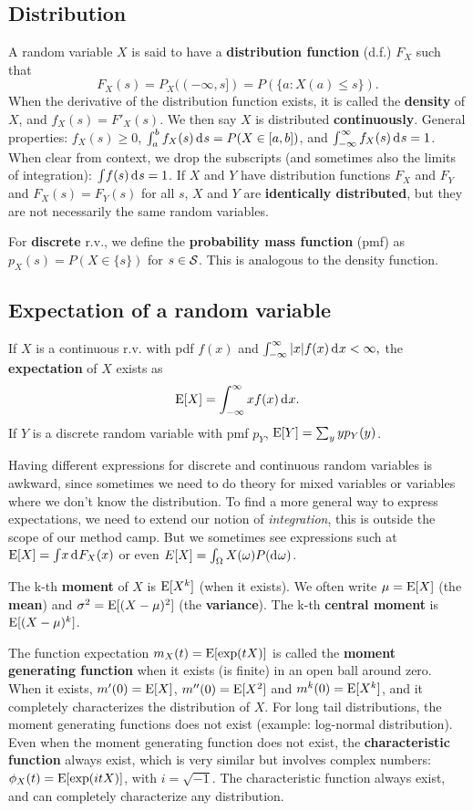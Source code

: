 \documentclass[twoside]{article}
\begin{document}
\subsection{Distribution}
A random variable $X$ is said to have a \textbf{distribution function} (d.f.) $F_X$
such that \[ F_X(s) = P_X((-\infty, s])=P(\{a: X(a)\leq s\}).\] When the derivative of the
distribution function exists, it is called the \textbf{density} of $X$, and
$f_X(s)=F'_X(s)$. We then say $X$ is distributed \textbf{continuously}. General
properties: $f_X(s)\geq0$, $\int_a^b f_X(s)\rd s = P(X\in[a,b])$, and
$\int_{-\infty}^\infty f_X(s) \rd s = 1$. When clear from context, we drop the
subscripts (and sometimes also the limits of integration): $\int\! f(s)\rd s=1$.
If $X$ and $Y$ have distribution functions $F_X$ and $F_Y$ and $F_X(s)=F_Y(s)$ for all
$s$, $X$ and $Y$ are \textbf{identically distributed}, but they are not necessarily the
same random variables.

For \textbf{discrete} r.v., we define the \textbf{probability mass function} (pmf) as
$p_X(s) = P(X\in\{s\})$ for $s\in\mathcal{S}$. This is analogous to the density function.

\subsection{Expectation of a random variable}
If $X$ is a continuous r.v.
with pdf $f(x)$ and 
\(\int_{-\infty}^\infty |x|f(x) \rd x < \infty,\)
the \textbf{expectation} of $X$ exists as  
\[\E[X] = \int_{-\infty}^\infty xf(x) \rd x.\]
If $Y$ is a discrete random variable with pmf $p_Y$, 
$\operatorname{E}[Y]=\sum_y yp_Y(y)$.

Having different expressions for discrete and continuous random variables is awkward, since
sometimes we need to do theory for mixed variables or variables where we don't know the 
distribution. To find a more general way to express expectations, we need to extend
our notion of \emph{integration}, this is outside the scope of our method camp. But we sometimes
see expressions such at $\E[X]=\int\! x \rd F_X(x)$
or even $E[X]=\int_\Omega X(\omega) P(\rd \omega)$.

The k-th \textbf{moment} of $X$ is $\operatorname{E} [X^k]$ (when it exists).  We often write $\mu=\operatorname{E}[X]$ (the \textbf{mean}) and
$\sigma^2 = \operatorname{E}[(X-\mu)^2]$ (the \textbf{variance}). The k-th \textbf{central moment} 
is $\operatorname{E} [ (X-\mu)^k]$.

The function expectation $m_X(t)=\operatorname{E}[\exp(tX)]$ is called the \textbf{moment
generating function} when it exists (is finite) in an open ball around zero. When it exists,
$m'(0)=\operatorname{E}[X]$, $m''(0)=\operatorname{E}[X^2]$ and $m^k(0)=\operatorname{E}[X^k]$, and it completely
characterizes the distribution of $X$. For long tail distributions, the moment generating
functions does not exist (example: log-normal distribution). Even when the moment generating function
does not exist, the \textbf{characteristic function} always exist, which is very similar but
involves complex numbers: $\phi_X(t)= \operatorname{E}[\exp(i t X)]$, with  $i = \sqrt{-1}$. The characteristic
function always exist, and can completely characterize any distribution. 
\end{document}
